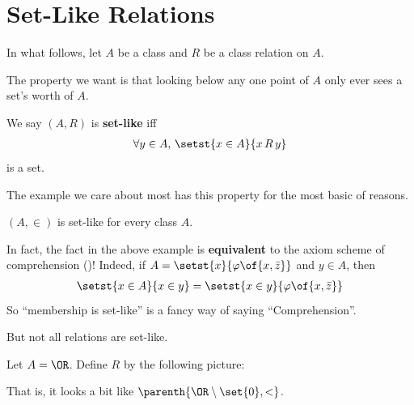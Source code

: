 \section{Set-Like Relations}

In what follows, let $A$ be a class and $R$ be a class relation on $A$.

The property we want is that looking below any one point of $A$ only ever sees a set's worth of $A$.

\begin{boxdefinition}
    We say $(A, R)$ is \textbf{set-like} iff
    \begin{align*}
        \forall y \in A, \, \setst{x \in A}{x \, R \, y}
    \end{align*}
    is a set.
\end{boxdefinition}

The example we care about most has this property for the most basic of reasons.

\begin{boxexample}[Membership]
    $(A, \in)$ is set-like for every class $A$.
\end{boxexample}

In fact, the fact in the above example is \textbf{equivalent} to the axiom scheme of comprehension ()! Indeed, if $A = \setst{x}{\varphi\of{x, \bar{z}}}$ and $y \in A$, then
\begin{align*}
    \setst{x \in A}{x \in y} = \setst{x \in y}{\varphi\of{x, \bar{z}}}
\end{align*}
So ``membership is set-like'' is a fancy way of saying ``Comprehension''.

But not all relations are set-like.

\begin{boxnexample}
    Let $A = \OR$. Define $R$ by the following picture:
    \begin{center}
    \end{center}
    That is, it looks a bit like $\parenth{\OR \setminus \set{0}, <}$.
\end{boxnexample}

